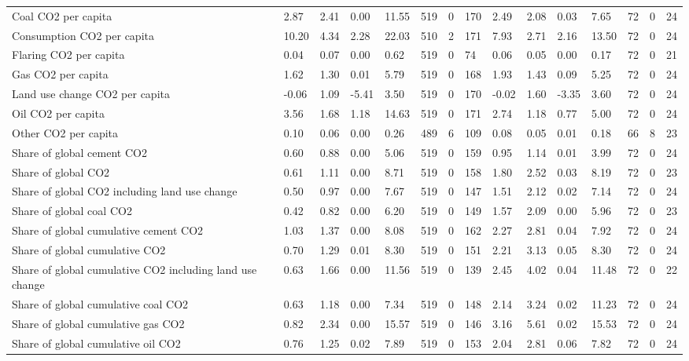 \begin{longtable}{lllllllllllllll}
Coal CO2 per capita & 2.87 & 2.41 & 0.00 & 11.55 & 519 & 0 & 170 & 2.49 & 2.08 & 0.03 & 7.65 & 72 & 0 & 24\\
\addlinespace
Consumption CO2 per capita & 10.20 & 4.34 & 2.28 & 22.03 & 510 & 2 & 171 & 7.93 & 2.71 & 2.16 & 13.50 & 72 & 0 & 24\\
Flaring CO2 per capita & 0.04 & 0.07 & 0.00 & 0.62 & 519 & 0 & 74 & 0.06 & 0.05 & 0.00 & 0.17 & 72 & 0 & 21\\
Gas CO2 per capita & 1.62 & 1.30 & 0.01 & 5.79 & 519 & 0 & 168 & 1.93 & 1.43 & 0.09 & 5.25 & 72 & 0 & 24\\
Land use change CO2 per capita & -0.06 & 1.09 & -5.41 & 3.50 & 519 & 0 & 170 & -0.02 & 1.60 & -3.35 & 3.60 & 72 & 0 & 24\\
Oil CO2 per capita & 3.56 & 1.68 & 1.18 & 14.63 & 519 & 0 & 171 & 2.74 & 1.18 & 0.77 & 5.00 & 72 & 0 & 24\\
\addlinespace
Other CO2 per capita & 0.10 & 0.06 & 0.00 & 0.26 & 489 & 6 & 109 & 0.08 & 0.05 & 0.01 & 0.18 & 66 & 8 & 23\\
Share of global cement CO2 & 0.60 & 0.88 & 0.00 & 5.06 & 519 & 0 & 159 & 0.95 & 1.14 & 0.01 & 3.99 & 72 & 0 & 24\\
Share of global CO2 & 0.61 & 1.11 & 0.00 & 8.71 & 519 & 0 & 158 & 1.80 & 2.52 & 0.03 & 8.19 & 72 & 0 & 23\\
Share of global CO2 including land use change & 0.50 & 0.97 & 0.00 & 7.67 & 519 & 0 & 147 & 1.51 & 2.12 & 0.02 & 7.14 & 72 & 0 & 24\\
Share of global coal CO2 & 0.42 & 0.82 & 0.00 & 6.20 & 519 & 0 & 149 & 1.57 & 2.09 & 0.00 & 5.96 & 72 & 0 & 23\\
\addlinespace
Share of global cumulative cement CO2 & 1.03 & 1.37 & 0.00 & 8.08 & 519 & 0 & 162 & 2.27 & 2.81 & 0.04 & 7.92 & 72 & 0 & 24\\
Share of global cumulative CO2 & 0.70 & 1.29 & 0.01 & 8.30 & 519 & 0 & 151 & 2.21 & 3.13 & 0.05 & 8.30 & 72 & 0 & 24\\
Share of global cumulative CO2 including land use change & 0.63 & 1.66 & 0.00 & 11.56 & 519 & 0 & 139 & 2.45 & 4.02 & 0.04 & 11.48 & 72 & 0 & 22\\
Share of global cumulative coal CO2 & 0.63 & 1.18 & 0.00 & 7.34 & 519 & 0 & 148 & 2.14 & 3.24 & 0.02 & 11.23 & 72 & 0 & 24\\
Share of global cumulative gas CO2 & 0.82 & 2.34 & 0.00 & 15.57 & 519 & 0 & 146 & 3.16 & 5.61 & 0.02 & 15.53 & 72 & 0 & 24\\
\addlinespace
Share of global cumulative oil CO2 & 0.76 & 1.25 & 0.02 & 7.89 & 519 & 0 & 153 & 2.04 & 2.81 & 0.06 & 7.82 & 72 & 0 & 24\\

\end{longtable}
